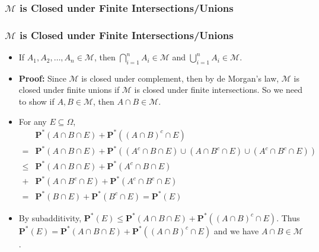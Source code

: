 \documentclass[handout]{beamer}
\newcommand{\BP}{\mathbf{P}}
\begin{document}
\subsubsection{$\mathcal{M}$ is Closed under Finite Intersections/Unions}
\frame
{
  \frametitle{$\mathcal{M}$ is Closed under Finite Intersections/Unions}

   \begin{itemize}

            \item<1->   [] \begin{Lemma}[2.3.10] If $A_1, A_2,\ldots, A_n \in \mathcal{M}$, then $\bigcap_{i=1}^n A_i \in \mathcal{M}$ and  $\bigcup_{i=1}^n A_i \in \mathcal{M}$.                \end{Lemma}    
       
              \item<2-> []\textbf{Proof:} Since $\mathcal{M}$ is closed under complement, then by de Morgan's law, $\mathcal{M}$ is closed under finite unions if $\mathcal{M}$ is closed under finite intersections. So we need to show if $A, B\in \mathcal{M}$, then $A\cap B\in \mathcal{M}$.
                         
             \item<3-> [1)]  For any $E\subseteq \Omega$, 
             \begin{align*}& \BP^*(A\cap B \cap E)+\BP^*( (A\cap B)^c \cap E) \\ = & \BP^*(A\cap B \cap E)+\BP^*( (A^c\cap B \cap E) \cup (A\cap B^c \cap E) \cup (A^c\cap B^c \cap E) )  \\ \leq & \BP^*(A\cap B \cap E)+\BP^*( A^c\cap B \cap E) \\ + & \BP^*(A\cap B^c \cap E) +\BP^*( A^c\cap B^c \cap E) \\= & \BP^*(B \cap E)+\BP^*( B^c \cap E)=\BP^*(E)
             \end{align*}
                 
              \item<4-> [2)]  By subadditivity, $\BP^*(E) \leq \BP^*(A\cap B \cap E)+\BP^*( (A\cap B)^c \cap E)$. Thus $\BP^*(E)=\BP^*(A\cap B \cap E)+\BP^*( (A\cap B)^c \cap E)$ and we have $A\cap B\in \mathcal{M}$.
             
             
                 \end{itemize}
}
\end{document}
